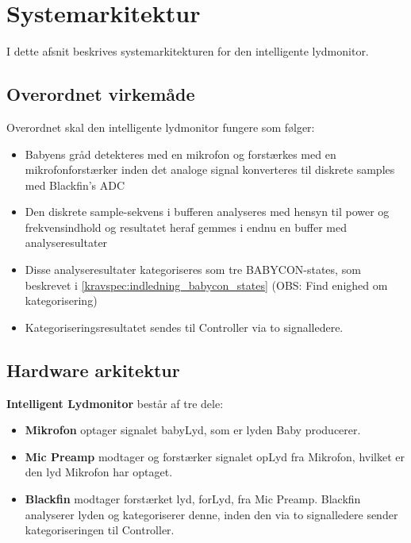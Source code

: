 \section{Systemarkitektur}

I dette afsnit beskrives systemarkitekturen for den intelligente lydmonitor.

\subsection*{Overordnet virkemåde}
Overordnet skal den intelligente lydmonitor fungere som følger:
\begin{itemize}
	\item Babyens gråd detekteres med en mikrofon og forstærkes med en mikrofonforstærker inden det analoge signal konverteres til diskrete samples med Blackfin's ADC
	\item Den diskrete sample-sekvens i bufferen analyseres med hensyn til power og frekvensindhold og resultatet heraf gemmes i endnu en buffer med analyseresultater
	\item Disse analyseresultater kategoriseres som tre BABYCON-states, som beskrevet i \ref{kravspec:indledning_babycon_states} (OBS: Find enighed om kategorisering)
	\item Kategoriseringsresultatet sendes til Controller via to signalledere.
\end{itemize}


\newpage
\subsection{Hardware arkitektur}

\textbf{Intelligent Lydmonitor} består af tre dele: 
\begin{itemize}
\item \textbf{Mikrofon} optager signalet babyLyd, som er lyden Baby producerer. 
\item \textbf{Mic Preamp} modtager og forstærker signalet opLyd fra Mikrofon, hvilket er den lyd Mikrofon har optaget. 
\item \textbf{Blackfin} modtager forstærket lyd, forLyd, fra Mic Preamp. Blackfin analyserer lyden og kategoriserer denne, inden den via to signalledere sender kategoriseringen til Controller. 
\end{itemize}

